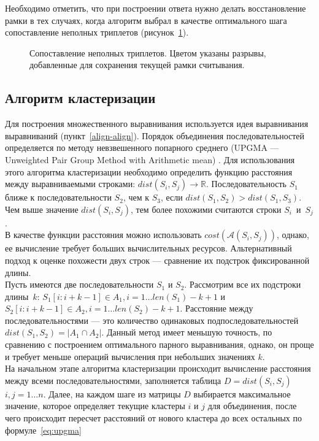 \indent Необходимо отметить, что при построении ответа нужно делать восстановление рамки в тех случаях, когда алгоритм выбрал в качестве оптимального шага сопоставление неполных триплетов (рисунок~\ref{ris:NotCompleteCodons}).

\begin{figure}[h]
	\caption{Сопоставление неполных триплетов. Цветом указаны разрывы, добавленные для сохранения текущей рамки считывания.}
	\label{ris:NotCompleteCodons}
\end{figure}

\subsection[Алгоритм кластеризации]{\large Алгоритм кластеризации}
\hspace{\parindent} Для построения множественного выравнивания используется идея выравнивания выравниваний (пункт~\ref{align-align}). Порядок объединения последовательностей определяется по методу невзвешенного попарного среднего (UPGMA --- Unweighted Pair Group Method with Arithmetic mean) \cite{legendre1998numerical}. Для использования этого алгоритма кластеризации необходимо определить функцию расстояния между выравниваемыми строками: $dist(S_i, S_j) \rightarrow \mathbb{R}$. Последовательность $S_1$ ближе к последовательности $S_2$, чем к $S_3$, если $dist(S_1, S_2) > dist(S_1, S_3)$. Чем выше значение $dist(S_i, S_j)$, тем более похожими считаются строки $S_i$~и~$S_j$.\\
\indent В качестве функции расстояния можно использовать $cost(\mathcal{A}(S_i, S_j))$, однако, ее вычисление требует больших вычислительных ресурсов. Альтернативный подход к оценке похожести двух строк --- сравнение их подстрок фиксированной длины.\\
\indent Пусть имеются две последовательности $S_1$ и $S_2$. Рассмотрим все их подстроки длины~$k$: $S_1[i: i+k-1] \in A_1, i = 1\dots len(S_1)-k+1$ и $S_2[i: i+k-1] \in A_2, i = 1\dots len(S_2)-k+1$. Расстояние между последовательностями --- это количество одинаковых подпоследовательностей $dist(S_1, S_2) = |A_1\cap A_2|$. Данный метод имеет меньшую точность, по сравнению с построением оптимального парного выравнивания, однако, он проще и требует меньше операций вычисления при небольших значениях $k$.\\
\indent На начальном этапе алгоритма кластеризации происходит вычисление расстояния между всеми последовательностями, заполняется таблица $D=dist(S_i, S_j)$ $i,j=1 \dots n$. Далее, на каждом шаге из матрицы $D$ выбирается максимальное значение, которое определяет текущие кластеры $i$ и $j$ для объединения, после чего происходит пересчет расстояний от нового кластера до всех остальных по формуле~\ref{eq:upgma} 

